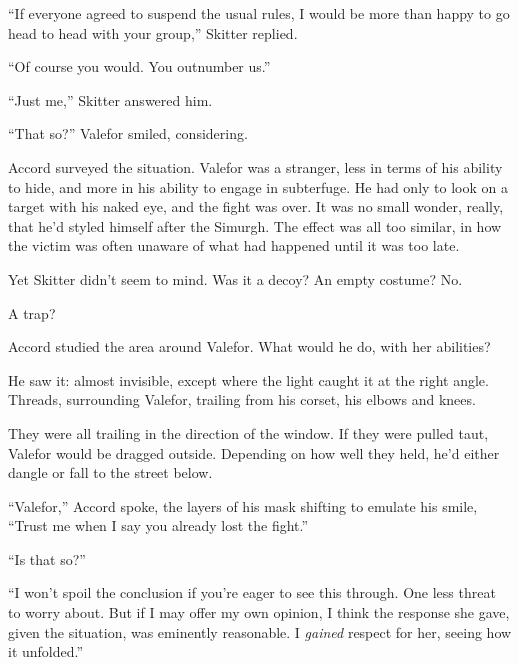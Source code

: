 ``If everyone agreed to suspend the usual rules, I would be more than happy to go head to head with your group,'' Skitter replied.



``Of course you would.  You outnumber us.''



``Just me,'' Skitter answered him.



``That so?''  Valefor smiled, considering.



Accord surveyed the situation.  Valefor was a stranger, less in terms of his ability to hide, and more in his ability to engage in subterfuge.  He had only to look on a target with his naked eye, and the fight was over.  It was no small wonder, really, that he'd styled himself after the Simurgh.  The effect was all too similar, in how the victim was often unaware of what had happened until it was too late.



Yet Skitter didn't seem to mind.  Was it a decoy?  An empty costume?  No.



A trap?



Accord studied the area around Valefor.  What would he do, with her abilities?



He saw it: almost invisible, except where the light caught it at the right angle.  Threads, surrounding Valefor, trailing from his corset, his elbows and knees.



They were all trailing in the direction of the window.  If they were pulled taut, Valefor would be dragged outside.  Depending on how well they held, he'd either dangle or fall to the street below.



``Valefor,'' Accord spoke, the layers of his mask shifting to emulate his smile, ``Trust me when I say you already lost the fight.''



``Is that so?''



``I won't spoil the conclusion if you're eager to see this through.  One less threat to worry about.  But if I may offer my own opinion, I think the response she gave, given the situation, was eminently reasonable.  I \emph{gained} respect for her, seeing how it unfolded.''



